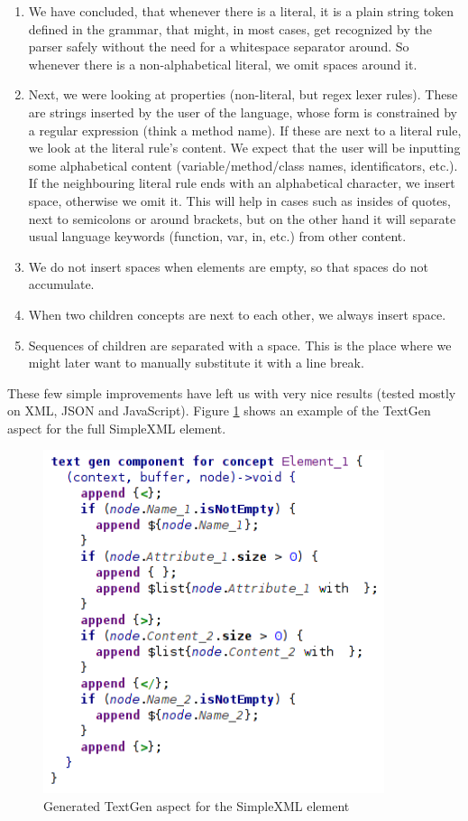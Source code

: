\begin{enumerate}
	\item We have concluded, that whenever there is a literal, it is a plain string token defined in the grammar, that might, in most cases, get recognized by the parser safely without the need for a whitespace separator around. So whenever there is a non-alphabetical literal, we omit spaces around it.

	\item Next, we were looking at properties (non-literal, but regex lexer rules). These are strings inserted by the user of the language, whose form is constrained by a regular expression (think a method name). If these are next to a literal rule, we look at the literal rule's content. We expect that the user will be inputting some alphabetical content (variable/method/class names, identificators, etc.). If the neighbouring literal rule ends with an alphabetical character, we insert space, otherwise we omit it. This will help in cases such as insides of quotes, next to semicolons or around brackets, but on the other hand it will separate usual language keywords (function, var, in, etc.) from other content.

	\item We do not insert spaces when elements are empty, so that spaces do not accumulate.

	\item When two children concepts are next to each other, we always insert space.

	\item Sequences of children are separated with a space. This is the place where we might later want to manually substitute it with a line break.
\end{enumerate}

These few simple improvements have left us with very nice results (tested mostly on XML, JSON and JavaScript). Figure \ref{fig:textgen_final} shows an example of the TextGen aspect for the full SimpleXML element.
\\

\begin{figure}[h]
	\centering
	\includegraphics[width=100mm]{../img/textgen_final.png}
	\caption{Generated TextGen aspect for the SimpleXML element}
	\label{fig:textgen_final}
\end{figure}

